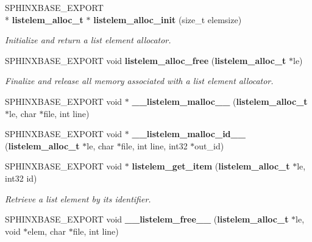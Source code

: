 \begin{DoxyCompactItemize}
\item 
S\-P\-H\-I\-N\-X\-B\-A\-S\-E\-\_\-\-E\-X\-P\-O\-R\-T \\*
{\bf listelem\-\_\-alloc\-\_\-t} $\ast$ {\bf listelem\-\_\-alloc\-\_\-init} (size\-\_\-t elemsize)\label{listelem__alloc_8h_a4b08b49eaa74cbe9a3c95170cee78de7}

\begin{DoxyCompactList}\small\item\em Initialize and return a list element allocator. \end{DoxyCompactList}\item 
S\-P\-H\-I\-N\-X\-B\-A\-S\-E\-\_\-\-E\-X\-P\-O\-R\-T void {\bf listelem\-\_\-alloc\-\_\-free} ({\bf listelem\-\_\-alloc\-\_\-t} $\ast$le)\label{listelem__alloc_8h_a94c02e93a0abaa2bd79636cbac6cced2}

\begin{DoxyCompactList}\small\item\em Finalize and release all memory associated with a list element allocator. \end{DoxyCompactList}\item 
S\-P\-H\-I\-N\-X\-B\-A\-S\-E\-\_\-\-E\-X\-P\-O\-R\-T void $\ast$ {\bfseries \-\_\-\-\_\-listelem\-\_\-malloc\-\_\-\-\_\-} ({\bf listelem\-\_\-alloc\-\_\-t} $\ast$le, char $\ast$file, int line)\label{listelem__alloc_8h_a04e5512f4dcedc2e84e58108bf61f1ff}

\item 
S\-P\-H\-I\-N\-X\-B\-A\-S\-E\-\_\-\-E\-X\-P\-O\-R\-T void $\ast$ {\bfseries \-\_\-\-\_\-listelem\-\_\-malloc\-\_\-id\-\_\-\-\_\-} ({\bf listelem\-\_\-alloc\-\_\-t} $\ast$le, char $\ast$file, int line, int32 $\ast$out\-\_\-id)\label{listelem__alloc_8h_a45f35edbe5f23773b1624f2ca2ac5e86}

\item 
S\-P\-H\-I\-N\-X\-B\-A\-S\-E\-\_\-\-E\-X\-P\-O\-R\-T void $\ast$ {\bf listelem\-\_\-get\-\_\-item} ({\bf listelem\-\_\-alloc\-\_\-t} $\ast$le, int32 id)\label{listelem__alloc_8h_a74e610ac90e2b0696b2aedef4289d8f3}

\begin{DoxyCompactList}\small\item\em Retrieve a list element by its identifier. \end{DoxyCompactList}\item 
S\-P\-H\-I\-N\-X\-B\-A\-S\-E\-\_\-\-E\-X\-P\-O\-R\-T void {\bf \-\_\-\-\_\-listelem\-\_\-free\-\_\-\-\_\-} ({\bf listelem\-\_\-alloc\-\_\-t} $\ast$le, void $\ast$elem, char $\ast$file, int line)\label{listelem__alloc_8h_ab83a7a6fd086c14140ad2c8c4162709b}


\end{DoxyCompactItemize}
